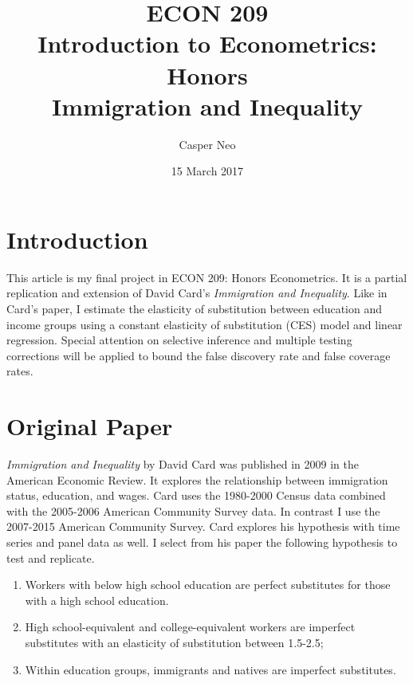 \documentclass[11pt]{article}
\theoremstyle{definition}
\theoremstyle{remark}
\newcommand{\name}{Casper Neo}
\newcommand{\classname}{Introduction to Econometrics: Honors}
\newcommand{\classnumber}{ECON 209}
\newcommand{\due}{15 March 2017}
\newcommand{\num}{}
\newcommand{\type}{Immigration and Inequality}
\begin{document}
\title{
	\vspace{-10mm}
    \classnumber\\
	\classname\\
    \type \space \num\\
}
\author{
	\name
}
\date{
	\due\\
}

\maketitle

\section{Introduction}

This article is my final project in ECON 209: Honors Econometrics.
It is a partial replication and extension of David Card's
\textit{Immigration and Inequality}. Like in Card's paper, I estimate the
elasticity of substitution between education and income groups using a constant
elasticity of substitution (CES) model and linear regression.
Special attention on selective inference and multiple testing
corrections will be applied to bound the false discovery rate and false coverage
rates.


\renewcommand{\baselinestretch}{0.9}\normalsize
\tableofcontents
\listoffigures
\listoftables
\renewcommand{\baselinestretch}{1.0}\normalsize

\pagebreak
\section{Original Paper}

\textit{Immigration and Inequality} by David Card was published in 2009 in the
American Economic Review. It explores the relationship between immigration
status, education, and wages. Card uses the 1980-2000 Census data combined with
the 2005-2006 American Community Survey data. In contrast I use the 2007-2015
American Community Survey. Card explores his hypothesis with time series and
panel data as well. I select from his paper the following hypothesis to
test and replicate.

\begin{enumerate}
    \item Workers with below high school education are perfect substitutes
    for those with a high school education.

    \item High school-equivalent and college-equivalent workers are imperfect
    substitutes with an elasticity of substitution between 1.5-2.5;

    \item Within education groups, immigrants and natives are imperfect
    substitutes.
\end{enumerate}
\end{document}
